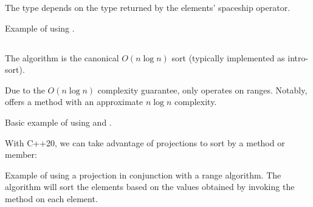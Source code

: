 The type depends on the type returned by the elements' spaceship operator.


\begin{codebox}[]{\href{https://compiler-explorer.com/z/vrEqPaEEz}{\ExternalLink}}
\footnotesize Example of using .
\tcblower
{}
\end{codebox}

\subsection{\texorpdfstring{}{\texttt{std::sort}}}

The  algorithm is the canonical $O(n\log n)$ sort (typically implemented as intro-sort).


Due to the $O(n\log n)$ complexity guarantee,  only operates on  ranges. Notably,  offers a method with an approximate $n\log n$ complexity.

\begin{codebox}[]{\href{https://compiler-explorer.com/z/vef61TWj9}{\ExternalLink}}
\footnotesize Basic example of using  and .
\tcblower
{}
\end{codebox}

With C++20, we can take advantage of projections to sort by a method or member:

\begin{codebox}[breakable]{\href{https://compiler-explorer.com/z/4aGenq9b6}{\ExternalLink}}
\footnotesize Example of using a projection in conjunction with a range algorithm. The algorithm will sort the elements based on the values obtained by invoking the method  on each element.
\tcblower
{}
\end{codebox}

